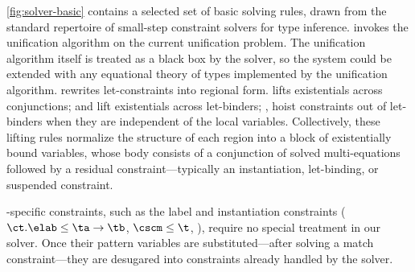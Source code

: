 \documentclass[acmsmall,screen,nonacm%
\Anonymous{,anonymous}{}%
\Final{}{,review}%
]{acmart}
\begin{document}
\cref{fig:solver-basic} contains a selected set of basic solving rules, drawn
from the standard repertoire of small-step constraint solvers for \ML type inference.
%
%
 invokes the unification algorithm on the
current unification problem. The unification algorithm itself is treated as a
black box by the solver, so the system could be extended with any
equational theory of types implemented by the unification algorithm.
%
 rewrites let-constraints into regional form.
%
 lifts existentials across conjunctions;
 and  lift existentials across
let-binders; ,  hoist constraints
out of let-binders when they are independent of the local variables.
%
Collectively, these lifting rules normalize the structure of each region into a
block of existentially bound variables, whose body consists of a conjunction of
solved multi-equations followed by a residual constraint---typically an
instantiation, let-binding, or suspended constraint.


\OML-specific constraints, such as the label and \polytype instantiation
constraints ($\labfrom \elab \ct \leq \ta \to \tb$, $\cleq \cscm \t$,
\etc), require no special treatment in our solver. Once their pattern variables
are substituted---after solving a match constraint---they are desugared into
constraints already handled by the solver.
\end{document}
